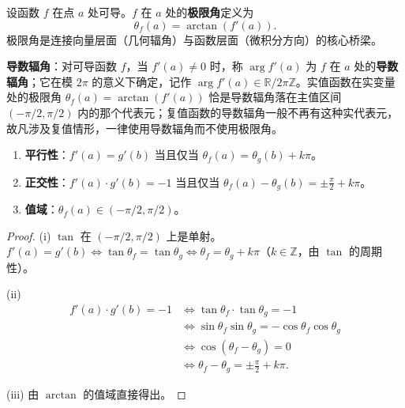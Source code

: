 \begin{definition}[极限角]\label{def:limit_angle}
设函数 $f$ 在点 $a$ 处可导。$f$ 在 $a$ 处的\textbf{极限角}定义为
\[\theta_f(a) = \arctan(f'(a)).\]
极限角是连接向量层面（几何辐角）与函数层面（微积分方向）的核心桥梁。

\textbf{导数辐角}：对可导函数 $f$，当 $f'(a) \neq 0$ 时，称 $\arg f'(a)$ 为 $f$ 在 $a$ 处的\textbf{导数辐角}；它在模 $2\pi$ 的意义下确定，记作 $\arg f'(a) \in \mathbb{R}/2\pi\mathbb{Z}$。实值函数在实变量处的极限角 $\theta_f(a) = \arctan(f'(a))$ 恰是导数辐角落在主值区间 $(-\pi/2, \pi/2)$ 内的那个代表元；复值函数的导数辐角一般不再有这种实代表元，故凡涉及复值情形，一律使用导数辐角而不使用极限角。
\end{definition}

\begin{proposition}[极限角的基本性质]\label{prop:limit_angle_properties}
\begin{enumerate}[label=(\roman*)]
    \item \textbf{平行性}：$f'(a) = g'(b)$ 当且仅当 $\theta_f(a) = \theta_g(b) + k\pi$。
    \item \textbf{正交性}：$f'(a) \cdot g'(b) = -1$ 当且仅当 $\theta_f(a) - \theta_g(b) = \pm \frac{\pi}{2} + k\pi$。
    \item \textbf{值域}：$\theta_f(a) \in (-\pi/2, \pi/2)$。
\end{enumerate}
\end{proposition}

\begin{proof}
(i) $\tan$ 在 $(-\pi/2, \pi/2)$ 上是单射。$f'(a) = g'(b) \iff \tan\theta_f = \tan\theta_g \iff \theta_f = \theta_g + k\pi$（$k \in \mathbb{Z}$，由 $\tan$ 的周期性）。

(ii)
\begin{align*}
f'(a) \cdot g'(b) = -1
&\iff \tan\theta_f \cdot \tan\theta_g = -1 \\
&\iff \sin\theta_f \sin\theta_g = -\cos\theta_f \cos\theta_g \\
&\iff \cos(\theta_f - \theta_g) = 0 \\
&\iff \theta_f - \theta_g = \pm \frac{\pi}{2} + k\pi.
\end{align*}

(iii) 由 $\arctan$ 的值域直接得出。
\end{proof}

